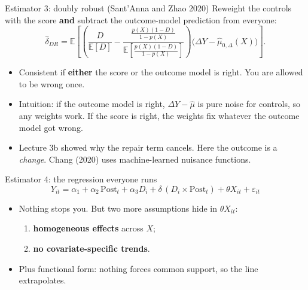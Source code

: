 \documentclass[
  11pt,
  ignorenonframetext,
  aspectratio=169,
]{beamer}
\providecommand{\tightlist}{%
  \setlength{\itemsep}{0pt}\setlength{\parskip}{0pt}}
\begin{document}
\begin{frame}{Estimator 3: doubly robust (Sant'Anna and Zhao 2020)}
\protect{}\label{estimator-3-doubly-robust-santanna-and-zhao-2020}
Reweight the controls with the score \textbf{and} subtract the
outcome-model prediction from everyone: \[
\hat\delta_{DR} = \mathbb{E}\!\left[\left(\frac{D}{\mathbb{E}[D]} - \frac{\frac{p(X)(1-D)}{1-p(X)}}{\mathbb{E}\!\left[\frac{p(X)(1-D)}{1-p(X)}\right]}\right)\big(\Delta Y - \hat\mu_{0,\Delta}(X)\big)\right].
\]

\begin{itemize}
\tightlist
\item
  Consistent if \textbf{either} the score or the outcome model is right.
  You are allowed to be wrong once.
\item
  Intuition: if the outcome model is right, \(\Delta Y - \hat\mu\) is
  pure noise for controls, so any weights work. If the score is right,
  the weights fix whatever the outcome model got wrong.
\item
  Lecture 3b showed why the repair term cancels. Here the outcome is a
  \emph{change}. Chang (2020) uses machine-learned nuisance functions.
\end{itemize}
\end{frame}

\begin{frame}{Estimator 4: the regression everyone runs}
\protect{}\label{estimator-4-the-regression-everyone-runs}
\[
Y_{it} = \alpha_1 + \alpha_2\,\text{Post}_t + \alpha_3 D_i + \delta\,(D_i \times \text{Post}_t) + \theta X_{it} + \varepsilon_{it}
\]

\begin{itemize}
\tightlist
\item
  Nothing stops you. But two more assumptions hide in \(\theta X_{it}\):

  \begin{enumerate}
  \tightlist
  \item
    \textbf{homogeneous effects} across \(X\);
  \item
    \textbf{no covariate-specific trends}.
  \end{enumerate}
\item
  Plus functional form: nothing forces common support, so the line
  extrapolates.
\end{itemize}
\end{frame}
\end{document}
